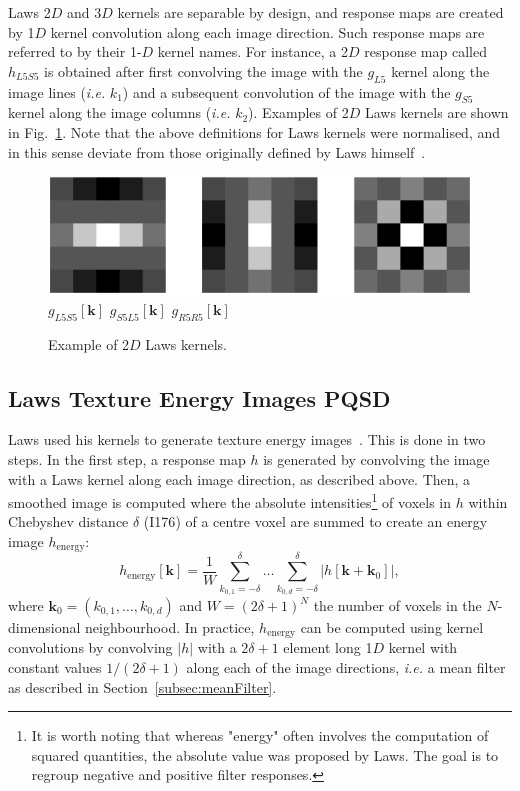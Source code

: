 \documentclass[fleqn,a4paper,oneside,openany]{book}
\newcommand\id[1]{{\hfill\normalsize{\idfont #1}}}
\newcommand\textid[1]{{\normalsize{\idfont #1}}}
\begin{document}
Laws 2$D$ and 3$D$ kernels are separable by design, and response maps are created by 1$D$ kernel convolution along each image direction. Such response maps are referred to by their 1-$D$ kernel names. For instance, a 2$D$ response map called $h_{L5S5}$ is obtained after first convolving the image with the $g_{L5}$ kernel along the image lines (\textit{i.e.} $k_1$) and a subsequent convolution of the image with the $g_{S5}$ kernel along the image columns (\textit{i.e.} $k_2$).
Examples of 2$D$ Laws kernels are shown in Fig.~\ref{fig:Laws}.
%
Note that the above definitions for Laws kernels were normalised, and in this sense deviate from those originally defined by Laws himself~\cite{Law1980}.
%
\begin{figure}
\centering
\includegraphics[trim = 0 0 0 0, clip, scale=0.6]{Laws.png}\\
$g_{L5S5}[\boldsymbol{k}]$
\hspace{1.9cm}
$g_{S5L5}[\boldsymbol{k}]$
\hspace{1.9cm}
$g_{R5R5}[\boldsymbol{k}]$
\caption{Example of 2$D$ Laws kernels.}
  \label{fig:Laws}
\end{figure}
%
\subsection[Laws Texture Energy Images]{Laws Texture Energy Images \id{PQSD}}
%
Laws used his kernels to generate texture energy images~\cite{Law1980}. This is done in two steps. In the first step, a response map $h$ is generated by convolving the image with a Laws kernel along each image direction, as described above. Then, a smoothed image is computed where the absolute intensities\footnote{It is worth noting that whereas "energy" often involves the computation of squared quantities, the absolute value was proposed by Laws. The goal is to regroup negative and positive filter responses.} of voxels in $h$ within Chebyshev distance $\delta$ (\textid{I176}) of a centre voxel are summed to create an energy image $h_{\text{energy}}$:
$$h_{\text{energy}}[\boldsymbol{k}]=\frac{1}{W}\sum_{k_{0,1}=-\delta}^{\delta}
\dots
\sum_{k_{0,d}=-\delta}^{\delta}\left|h[\boldsymbol{k}+\boldsymbol{k}_0]\right|,$$
where $\boldsymbol{k}_0=(k_{0,1},\dots,k_{0,d})$ and $W=\left(2\delta+1\right)^N$ the number of voxels in the $N$-dimensional neighbourhood.
In practice, \(h_{\text{energy}}\) can be computed using kernel convolutions by convolving $|h|$ with a $2\delta+1$ element long 1$D$ kernel with constant values $1/\left(2\delta+1\right)$ along each of the image directions, \textit{i.e.} a mean filter as described in Section~\ref{subsec:meanFilter}.
\end{document}
